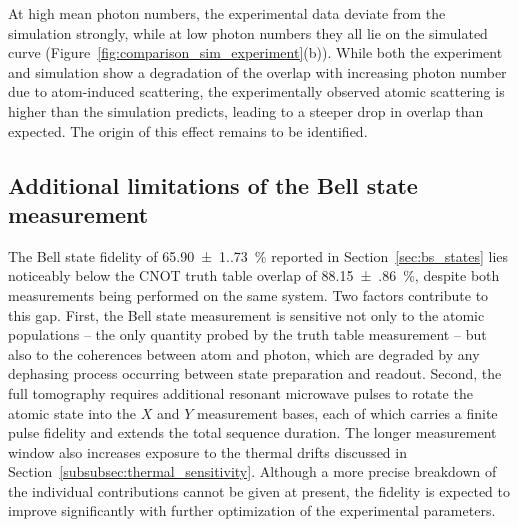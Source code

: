 At high mean photon numbers, the experimental data deviate from the simulation strongly, while at low photon numbers they all lie on the simulated curve (Figure~\ref{fig:comparison_sim_experiment}(b)). While both the experiment and simulation show a degradation of the overlap with increasing photon number due to atom-induced scattering, the experimentally observed atomic scattering is higher than the simulation predicts, leading to a steeper drop in overlap than expected. The origin of this effect remains to be identified.

\subsection{Additional limitations of the Bell state measurement}
\label{subsubsec:bell_state_limitations}

The Bell state fidelity of \SI{65.90(1.73)}{\percent} reported in Section~\ref{sec:bs_states} lies noticeably below the CNOT truth table overlap of \SI{88.15(86)}{\percent}, despite both measurements being performed on the same system. Two factors contribute to this gap. First, the Bell state measurement is sensitive not only to the atomic populations -- the only quantity probed by the truth table measurement -- but also to the coherences between atom and photon, which are degraded by any dephasing process occurring between state preparation and readout. Second, the full tomography requires additional resonant microwave pulses to rotate the atomic state into the $X$ and $Y$ measurement bases, each of which carries a finite pulse fidelity and extends the total sequence duration. The longer measurement window also increases exposure to the thermal drifts discussed in Section~\ref{subsubsec:thermal_sensitivity}. Although a more precise breakdown of the individual contributions cannot be given at present, the fidelity is expected to improve significantly with further optimization of the experimental parameters.
